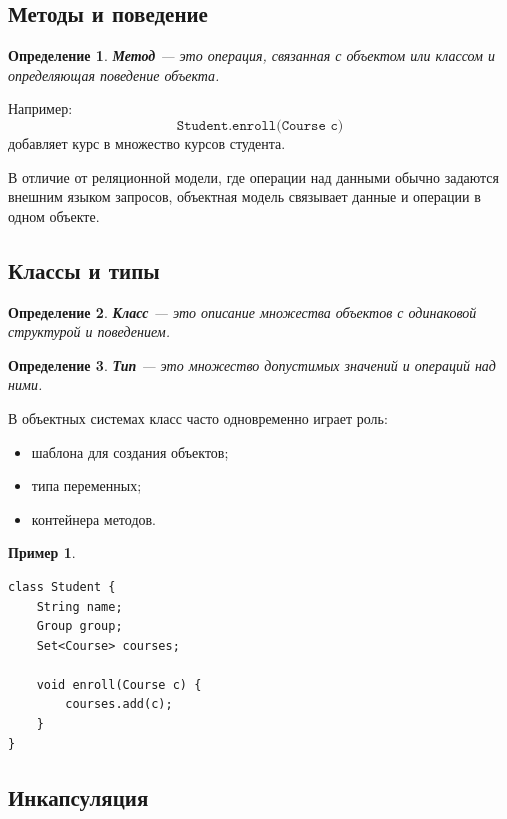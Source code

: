 \documentclass[12pt,a4paper]{article}
\newtheorem{definition}{Определение}[section]
\newtheorem{example}{Пример}[section]
\theoremstyle{remark}
\begin{document}
\subsection{Методы и поведение}

\begin{definition}
\textbf{Метод} --- это операция, связанная с объектом или классом и определяющая поведение объекта.
\end{definition}

Например:
\[
\texttt{Student.enroll(Course c)}
\]
добавляет курс в множество курсов студента.

В отличие от реляционной модели, где операции над данными обычно задаются внешним языком запросов, объектная модель связывает данные и операции в одном объекте.

\subsection{Классы и типы}

\begin{definition}
\textbf{Класс} --- это описание множества объектов с одинаковой структурой и поведением.
\end{definition}

\begin{definition}
\textbf{Тип} --- это множество допустимых значений и операций над ними.
\end{definition}

В объектных системах класс часто одновременно играет роль:
\begin{itemize}
    \item шаблона для создания объектов;
    \item типа переменных;
    \item контейнера методов.
\end{itemize}

\begin{example}
\begin{lstlisting}[style=sqlstyle]
class Student {
    String name;
    Group group;
    Set<Course> courses;

    void enroll(Course c) {
        courses.add(c);
    }
}
\end{lstlisting}
\end{example}

\subsection{Инкапсуляция}
\end{document}
